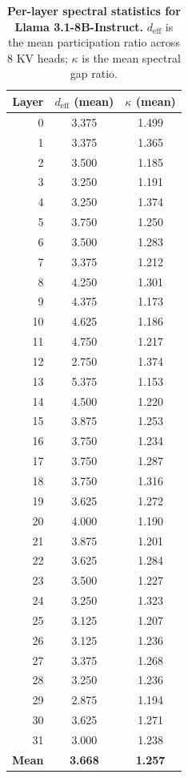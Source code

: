 \documentclass[11pt]{article}
\newcommand{\deff}{d_{\mathrm{eff}}}
\begin{document}
\begin{table}[!htbp]
\centering
\caption{\textbf{Per-layer spectral statistics for Llama 3.1-8B-Instruct.}
$\deff$ is the mean participation ratio across 8 KV heads; $\kappa$ is the
mean spectral gap ratio.}
\label{tab:perlayer}
\begin{tabular}{rcc}
\toprule
\textbf{Layer} & $\deff$ (mean) & $\kappa$ (mean) \\
\midrule
0  & 3.375 & 1.499 \\
1  & 3.375 & 1.365 \\
2  & 3.500 & 1.185 \\
3  & 3.250 & 1.191 \\
4  & 3.250 & 1.374 \\
5  & 3.750 & 1.250 \\
6  & 3.500 & 1.283 \\
7  & 3.375 & 1.212 \\
8  & 4.250 & 1.301 \\
9  & 4.375 & 1.173 \\
10 & 4.625 & 1.186 \\
11 & 4.750 & 1.217 \\
12 & 2.750 & 1.374 \\
13 & 5.375 & 1.153 \\
14 & 4.500 & 1.220 \\
15 & 3.875 & 1.253 \\
16 & 3.750 & 1.234 \\
17 & 3.750 & 1.287 \\
18 & 3.750 & 1.316 \\
19 & 3.625 & 1.272 \\
20 & 4.000 & 1.190 \\
21 & 3.875 & 1.201 \\
22 & 3.625 & 1.284 \\
23 & 3.500 & 1.227 \\
24 & 3.250 & 1.323 \\
25 & 3.125 & 1.207 \\
26 & 3.125 & 1.236 \\
27 & 3.375 & 1.268 \\
28 & 3.250 & 1.236 \\
29 & 2.875 & 1.194 \\
30 & 3.625 & 1.271 \\
31 & 3.000 & 1.238 \\
\midrule
\textbf{Mean} & \textbf{3.668} & \textbf{1.257} \\
\bottomrule
\end{tabular}
\end{table}
\end{document}
